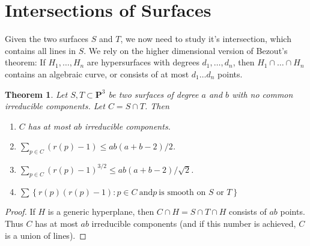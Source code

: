 \documentclass{article}
\theoremstyle{plain}
\newtheorem{theorem}{Theorem}
\theoremstyle{remark}
\theoremstyle{definition}
\begin{document}
\section{Intersections of Surfaces}

Given the two surfaces $S$ and $T$, we now need to study it's intersection, which contains all lines in $S$. We rely on the higher dimensional version of Bezout's theorem: If $H_1, \dots, H_n$ are hypersurfaces with degrees $d_1, \dots, d_n$, then $H_1 \cap \dots \cap H_n$ contains an algebraic curve, or consists of at most $d_1 \dots d_n$ points.

\begin{theorem}
    Let $S,T \subset \mathbf{P}^3$ be two surfaces of degree $a$ and $b$ with no common irreducible components. Let $C = S \cap T$. Then
    \begin{enumerate}
        \item $C$ has at most $ab$ irreducible components.
        \item $\sum_{p \in C} (r(p) - 1) \leq ab(a+b-2)/2$.
        \item $\sum_{p \in C} (r(p) - 1)^{3/2} \leq ab(a+b-2)/\sqrt{2}$.
        \item $\sum \left\{ r(p)(r(p) - 1) : p \in C\ \text{and} p\ \text{is smooth on $S$ or $T$} \right\}$
    \end{enumerate}
\end{theorem}
\begin{proof}
    If $H$ is a generic hyperplane, then $C \cap H = S \cap T \cap H$ consists of $ab$ points. Thus $C$ has at most $ab$ irreducible components (and if this number is achieved, $C$ is a union of lines).
\end{proof}
\end{document}
